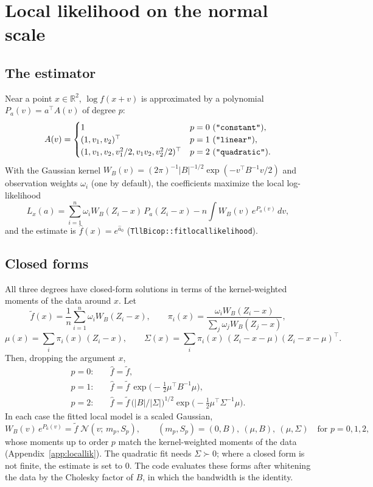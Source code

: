 \documentclass[11pt]{article}
\newcommand{\R}{\mathbb{R}}
\newcommand{\N}{\mathcal{N}}
\newcommand{\codeus}{\textunderscore\allowbreak}
\newcommand{\code}[1]{\begingroup\let\_\codeus\texttt{#1}\endgroup}
\begin{document}
\section{Local likelihood on the normal scale}
\label{sec:locallik}

\subsection{The estimator}

Near a point $x \in \R^2$, $\log f(x + v)$ is approximated by a polynomial
$P_a(v) = a^\top A(v)$ of degree $p$:
\[
  A(v) = \begin{cases}
    1 & p = 0\ (\code{"constant"}), \\
    (1, v_1, v_2)^\top & p = 1\ (\code{"linear"}), \\
    (1, v_1, v_2, v_1^2/2, v_1 v_2, v_2^2/2)^\top & p = 2\ (\code{"quadratic"}).
  \end{cases}
\]
With the Gaussian kernel $W_B(v) = (2\pi)^{-1} |B|^{-1/2}
\exp(-v^\top B^{-1} v / 2)$ and observation weights $\omega_i$ (one by
default), the coefficients maximize the local log-likelihood
\[
  L_x(a) = \sum_{i=1}^n \omega_i W_B(Z_i - x)\, P_a(Z_i - x)
           - n \int W_B(v)\, e^{P_a(v)}\, dv,
\]
and the estimate is $\hat f(x) = e^{\hat a_0}$
(\code{TllBicop::fit\_local\_likelihood}).

\subsection{Closed forms}

All three degrees have closed-form solutions in terms of the kernel-weighted
moments of the data around $x$. Let
\[
  \tilde f(x) = \frac{1}{n} \sum_{i=1}^n \omega_i W_B(Z_i - x), \qquad
  \pi_i(x) = \frac{\omega_i W_B(Z_i - x)}{\sum_j \omega_j W_B(Z_j - x)},
\]
\[
  \mu(x) = \sum_i \pi_i(x)\, (Z_i - x), \qquad
  \Sigma(x) = \sum_i \pi_i(x)\, (Z_i - x - \mu)(Z_i - x - \mu)^\top .
\]
Then, dropping the argument $x$,
\begin{align}
  p = 0:&\quad \hat f = \tilde f, \label{eq:constant}\\
  p = 1:&\quad \hat f = \tilde f\,
           \exp\bigl(-\tfrac12 \mu^\top B^{-1} \mu\bigr), \label{eq:linear}\\
  p = 2:&\quad \hat f = \tilde f\, \bigl(|B| / |\Sigma|\bigr)^{1/2}
           \exp\bigl(-\tfrac12 \mu^\top \Sigma^{-1} \mu\bigr).
           \label{eq:quadratic}
\end{align}
In each case the fitted local model is a scaled Gaussian,
\begin{equation}
  W_B(v)\, e^{P_{\hat a}(v)} = \tilde f\; \N(v;\, m_p, S_p), \qquad
  (m_p, S_p) = (0, B),\ (\mu, B),\ (\mu, \Sigma)
  \quad \text{for } p = 0, 1, 2,
  \label{eq:gaussian}
\end{equation}
whose moments up to order $p$ match the kernel-weighted moments of the data
(Appendix~\ref{app:locallik}). The quadratic fit needs $\Sigma \succ 0$; where
a closed form is not finite, the estimate is set to $0$. The code evaluates
these forms after whitening the data by the Cholesky factor of $B$, in which
the bandwidth is the identity.
\end{document}
